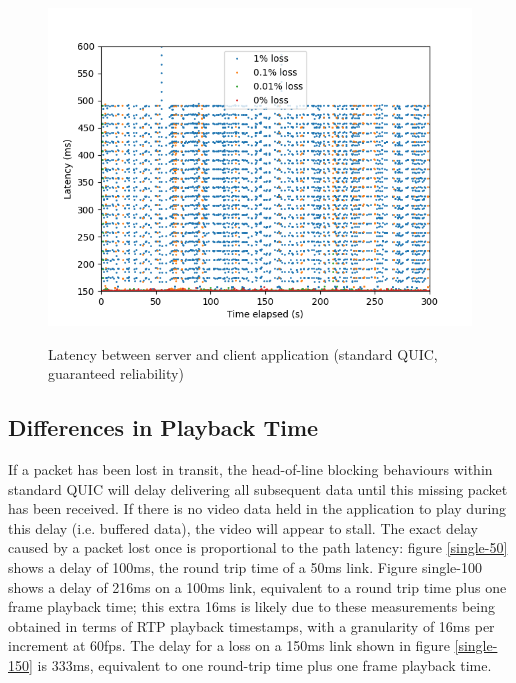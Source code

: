 \documentclass{mpaper}
\begin{document}
\begin{figure}
{   \includegraphics[scale=0.5]{images/graphics-reliable/150ms-app-latencies-combined-reliable.png}
   \label{app-rel-150}
 }
 \caption{Latency between server and client application (standard QUIC, guaranteed reliability)}
 \label{app-rel}
\end{figure}







\clearpage
\subsection{Differences in Playback Time}

If a packet has been lost in transit, the head-of-line blocking behaviours within standard QUIC will delay delivering all subsequent data until this missing packet has been received. If there is no video data held in the application to play during this delay (i.e. buffered data), the video will appear to stall. The exact delay caused by a packet lost once is proportional to the path latency: figure \ref{single-50} shows a delay of 100ms, the round trip time of a 50ms link. Figure {single-100} shows a delay of 216ms on a 100ms link, equivalent to a round trip time plus one frame playback time; this extra 16ms is likely due to these measurements being obtained in terms of RTP playback timestamps, with a granularity of 16ms per increment at 60fps. The delay for a loss on a 150ms link shown in figure \ref{single-150} is 333ms, equivalent to one round-trip time plus one frame playback time.
\end{document}
